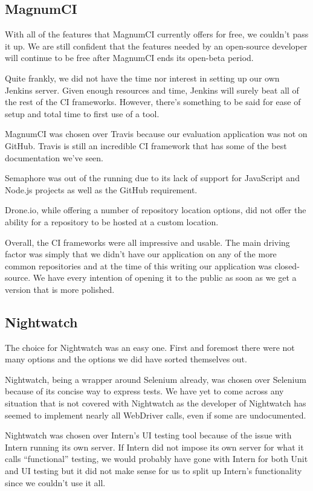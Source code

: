 \documentclass[12pt]{ucthesis}
\begin{document}
\subsection{MagnumCI}
With all of the features that MagnumCI currently offers for free, we couldn't pass it up. We are still confident that the features needed by an open-source developer will continue to be free after MagnumCI ends its open-beta period.

Quite frankly, we did not have the time nor interest in setting up our own Jenkins server. Given enough resources and time, Jenkins will surely beat all of the rest of the CI frameworks. However, there's something to be said for ease of setup and total time to first use of a tool.

MagnumCI was chosen over Travis because our evaluation application was not on GitHub. Travis is still an incredible CI framework that has some of the best documentation we've seen.

Semaphore was out of the running due to its lack of support for JavaScript and Node.js projects as well as the GitHub requirement.

Drone.io, while offering a number of repository location options, did not offer the ability for a repository to be hosted at a custom location.

Overall, the CI frameworks were all impressive and usable. The main driving factor was simply that we didn't have our application on any of the more common repositories and at the time of this writing our application was closed-source. We have every intention of opening it to the public as soon as we get a version that is more polished.

\subsection{Nightwatch}
The choice for Nightwatch was an easy one. First and foremost there were not many options and the options we did have sorted themselves out.

Nightwatch, being a wrapper around Selenium already, was chosen over Selenium because of its concise way to express tests. We have yet to come across any situation that is not covered with Nightwatch as the developer of Nightwatch has seemed to implement nearly all WebDriver calls, even if some are undocumented.

Nightwatch was chosen over Intern's UI testing tool because of the issue with Intern running its own server. If Intern did not impose its own server for what it calls ``functional'' testing, we would probably have gone with Intern for both Unit and UI testing but it did not make sense for us to split up Intern's functionality since we couldn't use it all.
\end{document}
